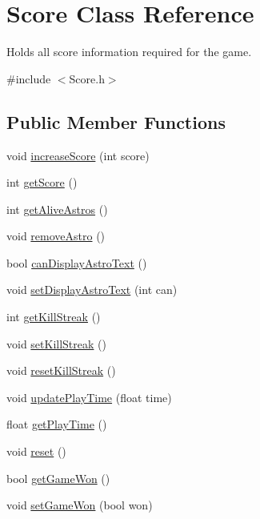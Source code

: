 \hypertarget{class_score}{}\section{Score Class Reference}
\label{class_score}


Holds all score information required for the game.  




{\ttfamily \#include $<$Score.\+h$>$}

\subsection*{Public Member Functions}
\begin{DoxyCompactItemize}
\item 
void \hyperlink{class_score_a9be80e91f6252cbb7c59d5212280e00f}{increase\+Score} (int score)
\item 
int \hyperlink{class_score_a8627c93270c188a3fd28a25b1d07a9e7}{get\+Score} ()
\item 
int \hyperlink{class_score_ad997fd059028945d10cfc8c056540a4f}{get\+Alive\+Astros} ()
\item 
void \hyperlink{class_score_ac826af8103f602c71d75d36aeecdff35}{remove\+Astro} ()
\item 
bool \hyperlink{class_score_a915cd675992bb150fcd67b43f7b8732e}{can\+Display\+Astro\+Text} ()
\item 
void \hyperlink{class_score_a3b9b2184527917932481449f410ab3ed}{set\+Display\+Astro\+Text} (int can)
\item 
int \hyperlink{class_score_a3bd9796efe8e7cf9bb1c97597e56bc01}{get\+Kill\+Streak} ()
\item 
void \hyperlink{class_score_af0065ea2bf0bf3c1dc92140a1f7e371f}{set\+Kill\+Streak} ()
\item 
void \hyperlink{class_score_a152a46eb1f165db706409369d4da7959}{reset\+Kill\+Streak} ()
\item 
void \hyperlink{class_score_a767d18294e41930ccece6d48c2398537}{update\+Play\+Time} (float time)
\item 
float \hyperlink{class_score_ae4fc66274baac2f13975f6139681b52c}{get\+Play\+Time} ()
\item 
void \hyperlink{class_score_a32804ba9a847e58160e6e0cef46e1f25}{reset} ()
\item 
bool \hyperlink{class_score_a4004909c5ca1ac466d55d32c5f6a30fd}{get\+Game\+Won} ()
\item 
void \hyperlink{class_score_a9d27b67bf0ec19b534a77ea2a2885f3f}{set\+Game\+Won} (bool won)
\end{DoxyCompactItemize}
